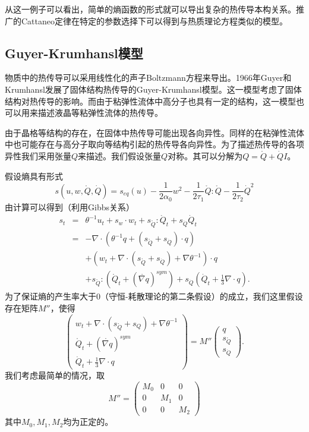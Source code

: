从这一例子可以看出，简单的熵函数的形式就可以导出复杂的热传导本构关系。推广的Cattaneo定律在特定的参数选择下可以得到与热质理论方程类似的模型。

\subsection{Guyer-Krumhansl模型}
物质中的热传导可以采用线性化的声子Boltzmann方程来导出。1966年Guyer和Krumhansl发展了固体结构热传导的Guyer-Krumhansl模型\cite{guyer1966solution}。这一模型考虑了固体结构对热传导的影响。而由于粘弹性流体中高分子也具有一定的结构，这一模型也可以用来描述液晶等粘弹性流体的热传导\cite{van2002weakly,van2005exploiting}。

由于晶格等结构的存在，在固体中热传导可能出现各向异性。同样的在粘弹性流体中也可能存在与高分子取向等结构引起的热传导各向异性。为了描述热传导的各项异性我们采用张量$Q$来描述。我们假设张量${Q}$对称。其可以分解为${Q}=\mathring{{Q}}+\dot{Q}{I}$。

假设熵具有形式
\begin{equation*}
s(u,{w},\mathring{{Q}},\dot{Q})=s_{eq}(u)-\frac{1}{2 \alpha_0}{w}^2-\frac{1}{2\tau_1} {\mathring{{Q}}}:{\mathring{{Q}}}-\frac{1}{2\tau_2}\dot{Q}^2
\end{equation*}
由计算可以得到（利用Gibbs关系）
\begin{eqnarray*}
s_t &=& \theta^{-1} u_t +s_{w} \cdot {w}_t + s_{\mathring{{Q}}}:\mathring{{Q}}_t+s_{\dot{Q}} \dot{Q}_t \\
    &=& -\nabla \cdot (\theta^{-1} {q}+ (s_{\mathring{{Q}}}+s_{\dot{Q}}) \cdot {q})\\
    	&&+({w}_t+\nabla \cdot (s_{\mathring{{Q}}}+s_{\dot{Q}})+\nabla \theta^{-1}) \cdot {q} \\
&& +s_{\mathring{{Q}}}:(\mathring{{Q}}_t+(\mathring{\nabla {q}})^{sym})+s_{\dot{Q}}(\dot{Q}_t+\frac{1}{3}\nabla \cdot {q}).
\end{eqnarray*}
为了保证熵的产生率大于0（守恒-耗散理论的第二条假设）的成立，我们这里假设存在矩阵$M''$，使得
\begin{equation*}
\left( \begin{array}{ll} {w}_t+\nabla \cdot (s_{\mathring{{Q}}}+s_Q)+\nabla \theta^{-1} \\ \mathring{{Q}}_t+(\mathring{\nabla {q}})^{sym} \\ \dot{Q}_t+\frac{1}{3} \nabla \cdot {q} \end{array} \right) = M'' \left( \begin{array}{l} {q} \\ s_{\mathring{{Q}}} \\s_{\dot{Q}} \end{array} \right).
\end{equation*}
我们考虑最简单的情况，取
\begin{equation*}
	M''=\left( \begin{array}{lll} M_0 & 0 & 0 \\0 & M_1 & 0 \\0 & 0 & M_2 \end{array} \right)
\end{equation*}
其中$M_0,M_1,M_2$均为正定的。

